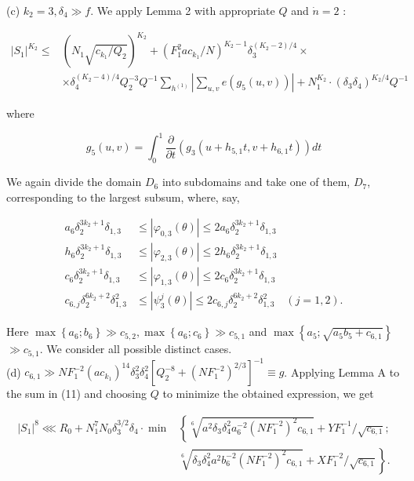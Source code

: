 \documentclass[10pt]{article}
\begin{document}
(c) $k_{2}=3, \delta_{4} \gg f$. We apply Lemma 2 with appropriate $Q$ and $\dot{n}=2$ :


\begin{align*}
\left|S_{1}\right|^{K_{2}} \leqslant & \left(N_{1} \sqrt{c_{k_{1}} / Q_{2}}\right)^{K_{2}}+\left(F_{1}^{2} a c_{k_{1}} / N\right)^{K_{2}-1} \delta_{3}^{\left(K_{2}-2\right) / 4} \times  \tag{11}\\
& \times \delta_{4}^{\left(K_{2}-4\right) / 4} Q_{2}^{-3} Q^{-1} \sum_{h^{(1)}}\left|\sum_{u, v} e\left(g_{5}(u, v)\right)\right|+N_{1}^{K_{2}} \cdot\left(\delta_{3} \delta_{4}\right)^{K_{2} / 4} Q^{-1}
\end{align*}


where

$$
g_{5}(u, v)=\int_{0}^{1} \frac{\partial}{\partial t}\left(g_{3}\left(u+h_{5,1} t, v+h_{6,1} t\right)\right) d t
$$

We again divide the domain $D_{6}$ into subdomains and take one of them, $D_{7}$, corresponding to the largest subsum, where, say,

$$
\begin{aligned}
a_{6} \delta_{2}^{3 k_{2}+1} \delta_{1,3} & \leqslant\left|\varphi_{0,3}(\theta)\right| \leqslant 2 a_{6} \delta_{2}^{3 k_{2}+1} \delta_{1,3} \\
h_{6} \delta_{2}^{3 k_{2}+1} \delta_{1,3} & \leqslant\left|\varphi_{2,3}(\theta)\right| \leqslant 2 h_{6} \delta_{2}^{3 k_{2}+1} \delta_{1,3} \\
c_{6} \delta_{2}^{3 k_{2}+1} \delta_{1,3} & \leqslant\left|\varphi_{1,3}(\theta)\right| \leqslant 2 c_{6} \delta_{2}^{3 k_{2}+1} \delta_{1,3} \\
c_{6, j} \delta_{2}^{6 k_{2}+2} \delta_{1,3}^{2} & \leqslant\left|\psi_{3}^{j}(\theta)\right| \leqslant 2 c_{6, j} \delta_{2}^{6 k_{2}+2} \delta_{1,3}^{2} \quad(j=1,2) .
\end{aligned}
$$

Here $\max \left\{a_{6} ; b_{6}\right\} \gg c_{5,2}, \max \left\{a_{6} ; c_{6}\right\} \gg c_{5,1}$ and $\max \left\{a_{5} ; \sqrt{a_{5} b_{5}+c_{6,1}}\right\}$ $\gg c_{5,1}$. We consider all possible distinct cases.\\
(d) $c_{6,1} \gg N F_{1}^{-2}\left(a c_{k_{1}}\right)^{14} \delta_{3}^{2} \delta_{4}^{2}\left[Q_{2}^{-8}+\left(N F_{1}^{-2}\right)^{2 / 3}\right]^{-1} \equiv g$. Applying Lemma A to the sum in (11) and choosing $Q$ to minimize the obtained expression, we get

$$
\begin{aligned}
\left|S_{1}\right|^{8} \lll R_{0}+N_{1}^{7} N_{0} \delta_{3}^{3 / 2} \delta_{4} \cdot \min & \left\{\sqrt[6]{a^{2} \delta_{3} \delta_{4}^{2} a_{6}^{-2}\left(N F_{1}^{-2}\right)^{2} c_{6,1}}+Y F_{1}^{-1} / \sqrt{c_{6,1}} ;\right. \\
& \left.\sqrt[6]{\delta_{3} \delta_{4}^{2} a^{2} b_{6}^{-2}\left(N F_{1}^{-2}\right)^{2} c_{6,1}}+X F_{1}^{-2} / \sqrt{c_{6,1}}\right\} .
\end{aligned}
$$
\end{document}
